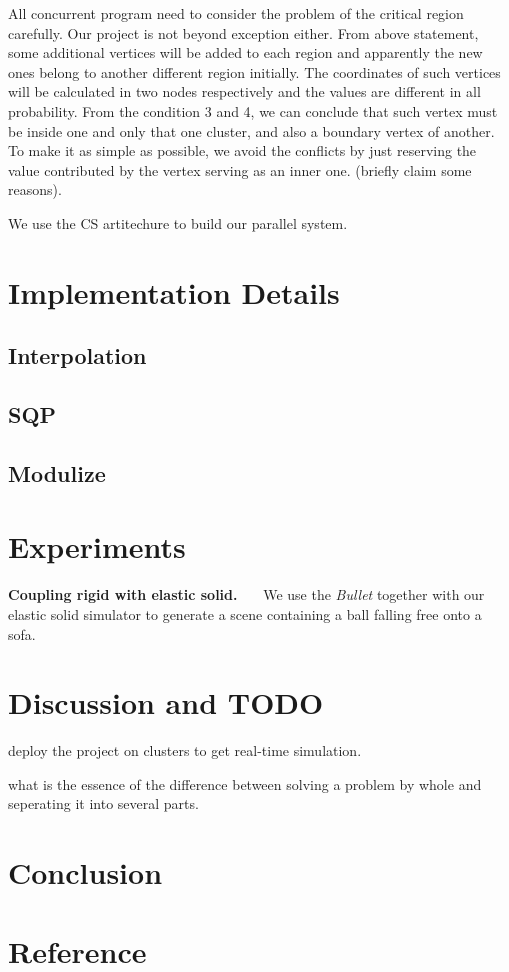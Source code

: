 \documentclass[a4paper,9pt,twocolumn]{extarticle}
\begin{document}
All concurrent program need to consider the problem of the critical region carefully. Our project is not beyond exception either. From above statement, some additional vertices will be added to each region and apparently the new ones belong to another different region initially. The coordinates of such vertices will be calculated in two nodes respectively and the values are different in all probability. From the condition 3 and 4, we can conclude that such vertex must be inside one and only that one cluster, and also a boundary vertex of another. To make it as simple as possible, we avoid the conflicts by just reserving the value contributed by the vertex serving as an inner one. (briefly claim some reasons).

We use the CS artitechure to build our parallel system.
\section{Implementation Details}
\subsection{Interpolation}

\subsection{SQP}

\subsection{Modulize}

\section{Experiments}
\textbf{Coupling rigid with elastic solid.} ~~~We use the \textit{Bullet} together with our elastic solid simulator to generate a scene containing a ball falling free onto a sofa.
\section{Discussion and TODO}
deploy the project on clusters to get real-time simulation.

what is the essence of the difference between solving a problem by whole and seperating it into several parts.






\section{Conclusion}

\section{Reference}
\end{document}
